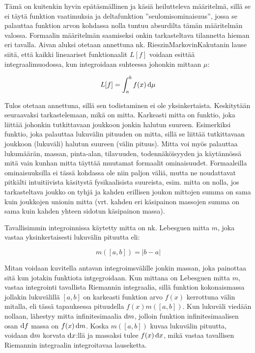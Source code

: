\documentclass[../johdoksia.tex]{subfiles}
\begin{document}
	Tämä on kuitenkin hyvin epätäsmällinen ja käsiä heilutteleva määritelmä, sillä se ei täytä funktion vaatimuksia ja deltafunktion ''seulomisominaisuus'', jossa se palauttaa funktion arvon kohdassa nolla tuntuu absurdilta tämän määritelmän valossa. Formaalin määritelmän saamiseksi onkin tarkasteltava tilannetta hieman eri tavalla. Aivan aluksi otetaan annettuna nk. Rieszin\textendash Markovin\textendash Kakutanin lause siitä, että kaikki lineaariset funktionaalit $L[f]$ voidaan esittää integraalimuodossa, kun integroidaan suhteessa johonkin mittaan $\mu$:
	
	\begin{equation}
		\label{linfunc}
		L[f] = \int_{a}^{b}f(x)\odif{\mu}
	\end{equation}

	Tulos otetaan annettuna, sillä sen todistaminen ei ole yksinkertaista. Keskitytään seuraavaksi tarkastelemaan, mikä on mitta. Karkeasti mitta on funktio, joka liittää johonkin tutkittavaan joukkoon jonkin halutun suureen. Esimerkiksi funktio, joka palauttaa lukuvälin pituuden on mitta, sillä se liittää tutkittavaan joukkoon (lukuväli) halutun suureen (välin pituus). Mitta voi myös palauttaa lukumäärän, massan, pinta-alan, tilavuuden, todennäköisyyden ja käytännössä mitä vain kunhan mitta täyttää muutamat formaalit ominaisuudet. Formaaleilla ominaisuuksilla ei tässä kohdassa ole niin paljon väliä, mutta ne noudattavat pitkälti intuitiivista käsitystä fysikaalisista suureista, esim. mitta on nolla, jos tarkasteltava joukko on tyhjä ja kahden erillisen joukon mittojen summa on sama kuin joukkojen unionin mitta (vrt. kahden eri käsipainon massojen summa on sama kuin kahden yhteen sidotun käsipainon massa). 
	
	Tavallisimmin integroinnissa käytetty mitta on nk. Lebesguen mitta $m$, joka vastaa yksinkertaisesti lukuvälin pituutta eli:
	
	\begin{equation*}
		m([a, b]) = |b - a|
	\end{equation*}

	Mitan voidaan kuvitella antavan integroimsvälille jonkin massan, joka painottaa sitä kun jotakin funktiota intgegroidaan. Kun mittana on Lebesguen mitta $m$, vastaa integrointi tavallista Riemannin integraalia, sillä funktion kokonaismassa jollakin lukuvälillä $[a, b]$ on karkeasti funktion arvo $f(x)$ kerrottuna välin mitalla, eli tässä tapauksessa pituudella $f(x)m([a,b])$. Kun lukuväli viedään nollaan, lähestyy mitta infinitesimaalia $\odif{m}$, jolloin funktion infinitesimaalisen osan $\odif{f}$ massa on $f(x)\odif{m}$. Koska $m([a, b])$ kuvaa lukuvälin pituutta, voidaan $\odif{m}$ korvata $\odif{x}$:llä ja massaksi tulee $f(x)\odif{x}$, mikä vastaa tavallisen Riemannin integraalin integroitavaa lauseketta.
	
\end{document}
